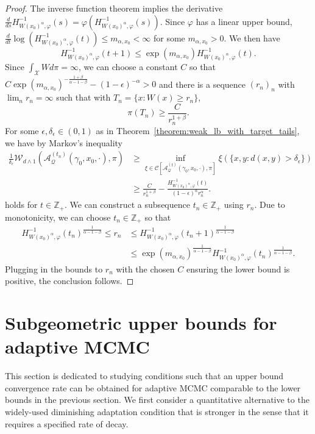 \documentclass[12pt]{article}
\theoremstyle{plain}
\theoremstyle{remark}
\newcommand{\e}{\epsilon}
\newcommand{\Z}{\mathbb{Z}}
\newcommand{\Q}{\mathcal{Q}}
\newcommand{\W}{\mathcal{W}}
\newcommand{\A}{\mathcal{A}}
\newcommand{\X}{\mathcal{X}}
\newcommand{\C}{\mathcal{C}}
\let\temp\phi
\let\phi\varphi
\let\varphi\temp
\begin{document}
\begin{proof}
The inverse function theorem implies the derivative 
$
\frac{d}{ds} H_{ W(x_0)^\alpha, \phi}^{-1}(s) 
= \phi(H^{-1}_{ W(x_0)^\alpha, \phi}(s)).
$
Since $\phi$ has a linear upper bound,
$\frac{d}{dt} \log(H_{ W(x_0)^\alpha, \phi}^{-1}(t) ) \le m_{\alpha, x_0} < \infty$ for some $m_{\alpha, x_0} > 0$.
We then have
\[
H_{ W(x_0)^\alpha, \phi}^{-1}(t + 1)
\le \exp( m_{\alpha, x_0} ) H_{ W(x_0)^\alpha, \phi}^{-1}(t).
\]
Since $\int_\X W d\pi = \infty$, we can choose a constant $C$ so that
$C \exp( m_{\alpha, x_0} )^{-\frac{1 + \beta}{\alpha - 1 - \beta}} - (1 - \e)^{-\alpha} > 0$ and there is a sequence $(r_n)_n$ with $\lim_n r_n = \infty$ such that with $T_{n} = \{x : W(x) \ge r_n \}$,
\[
\pi(T_n)
\ge \frac{C}{r_n^{1 + \beta}}.
\]
For some $\e, \delta_\e \in (0, 1)$ as in Theorem~\ref{theorem:weak_lb_with_target_tails}, we have by Markov's inequality
\begin{align*}
\frac{1}{\delta_\e} \W_{d \wedge 1}\left(\A_{\Q}^{(t_n)}(\gamma_0, x_0, \cdot), \pi \right)
&\ge \inf_{\xi \in \C\left[ \A_{\Q}^{(t)}(\gamma_0, x_0, \cdot), \pi \right] } \xi( \{ x, y : d(x, y) > \delta_\e \})
\\
&\ge \frac{C}{r_n^{1 + \beta}} - \frac{H_{W(x_0)^\alpha, \phi}^{-1}(t) }{ (1 - \e)^{\alpha} r_n^{\alpha} }.
\end{align*}
holds for $t \in \Z_+$.
We can construct a subsequence $t_n \in \Z_+$ using $r_n$.
Due to monotonicity, we can choose $t_n \in \Z_+$ so that
\begin{align*}
H_{ W(x_0)^\alpha, \phi}^{-1}(t_n)^{\frac{1}{\alpha - 1 - \beta}}
\le r_n
&\le H_{ W(x_0)^\alpha, \phi}^{-1}(t_n + 1)^{\frac{1}{\alpha - 1 - \beta}}
\\
&\le \exp( m_{\alpha, x_0} )^{\frac{1}{\alpha - 1 - \beta}} H_{ W(x_0)^\alpha, \phi}^{-1}(t_n)^{\frac{1}{\alpha - 1 - \beta}}.
\end{align*}
Plugging in the bounds to $r_n$ with the chosen $C$ ensuring the lower bound is positive, the conclusion follows.
\end{proof}

\section{Subgeometric upper bounds for adaptive MCMC}
\label{section:upper_bounds}

This section is dedicated to studying conditions such that an upper bound convergence rate can be obtained for adaptive MCMC comparable to the lower bounds in the previous section.
We first consider a quantitative alternative to the widely-used diminishing adaptation condition \citep{roberts:rosenthal:2007} that is stronger in the sense that it requires a specified rate of decay.
\end{document}
